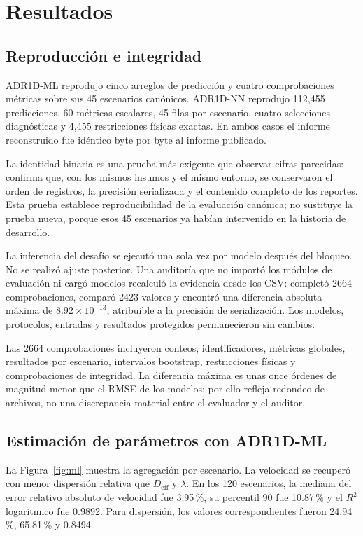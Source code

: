 \documentclass[11pt,a4paper]{article}
\begin{document}
\section{Resultados}

\subsection{Reproducción e integridad}

ADR1D-ML reprodujo cinco arreglos de predicción y cuatro comprobaciones
métricas sobre sus 45 escenarios canónicos. ADR1D-NN reprodujo 112,455
predicciones, 60 métricas escalares, 45 filas por escenario, cuatro selecciones
diagnósticas y 4,455 restricciones físicas exactas. En ambos casos el informe
reconstruido fue idéntico byte por byte al informe publicado.

La identidad binaria es una prueba más exigente que observar cifras parecidas:
confirma que, con los mismos insumos y el mismo entorno, se conservaron el orden
de registros, la precisión serializada y el contenido completo de los reportes.
Esta prueba establece reproducibilidad de la evaluación canónica; no sustituye
la prueba nueva, porque esos 45 escenarios ya habían intervenido en la historia
de desarrollo.

La inferencia del desafío se ejecutó una sola vez por modelo después del
bloqueo. No se realizó ajuste posterior. Una auditoría que no importó los
módulos de evaluación ni cargó modelos recalculó la evidencia desde los CSV:
completó 2664 comprobaciones, comparó 2423 valores y encontró una diferencia
absoluta máxima de $8.92\times10^{-13}$, atribuible a la precisión de
serialización. Los modelos, protocolos, entradas y resultados protegidos
permanecieron sin cambios.

Las 2664 comprobaciones incluyeron conteos, identificadores, métricas globales,
resultados por escenario, intervalos bootstrap, restricciones físicas y
comprobaciones de integridad. La diferencia máxima es unas once órdenes de magnitud menor que el
RMSE de los modelos; por ello refleja redondeo de archivos, no una discrepancia
material entre el evaluador y el auditor.

\subsection{Estimación de parámetros con ADR1D-ML}

La Figura~\ref{fig:ml} muestra la agregación por escenario. La velocidad se
recuperó con menor dispersión relativa que $D_{\mathrm{eff}}$ y $\lambda$. En
los 120 escenarios, la mediana del error relativo absoluto de velocidad fue
3.95\,\%, su percentil 90 fue 10.87\,\% y el $R^2$ logarítmico fue 0.9892. Para
dispersión, los valores correspondientes fueron 24.94\,\%, 65.81\,\% y 0.8494.
\end{document}
